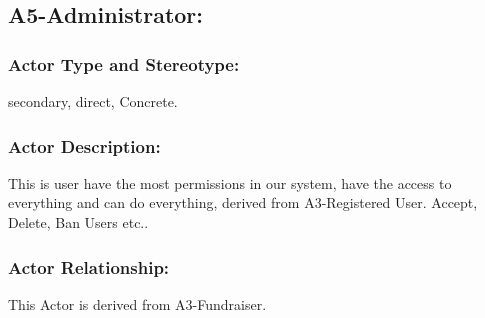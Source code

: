 \documentclass[11pt, openany]{report}
\begin{document}

\clearpage

\subsection{A5-Administrator:}
\label{A5}
\subsubsection{Actor Type and Stereotype:}
secondary, direct, Concrete.
\subsubsection{Actor Description:}
This is user have the most permissions in our system, have the access to everything and can do everything, derived from A3-Registered User.
Accept, Delete, Ban Users etc..
\subsubsection{Actor Relationship:}

This Actor is derived from A3-Fundraiser.
\end{document}
